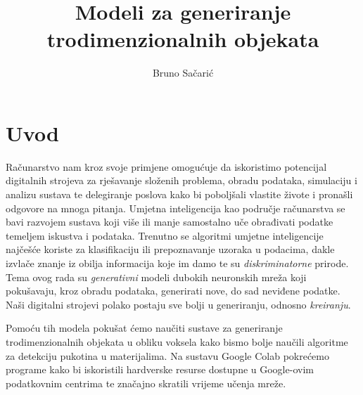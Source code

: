 \documentclass[times, utf8, diplomski]{fer}
\begin{document}

\title{Modeli za generiranje trodimenzionalnih objekata}

\author{Bruno Sačarić}

\maketitle

\izvornik


\tableofcontents

\chapter{Uvod}

Računarstvo nam kroz svoje primjene omogućuje da iskoristimo potencijal digitalnih strojeva za rješavanje složenih problema, obradu podataka, simulaciju i analizu sustava te delegiranje poslova kako bi poboljšali vlastite živote i pronašli odgovore na mnoga pitanja. Umjetna inteligencija kao područje računarstva se bavi razvojem sustava koji više ili manje samostalno uče obrađivati podatke temeljem iskustva i podataka. Trenutno se algoritmi umjetne inteligencije najčešće koriste za klasifikaciju ili prepoznavanje uzoraka u podacima, dakle izvlače znanje iz obilja informacija koje im damo te su \textit{diskriminatorne} prirode. Tema ovog rada su \textit{generativni} modeli dubokih neuronskih mreža koji pokušavaju, kroz obradu podataka, generirati nove, do sad neviđene podatke. Naši digitalni strojevi polako postaju sve bolji u generiranju, odnosno \textit{kreiranju}.

Pomoću tih modela pokušat ćemo naučiti sustave za generiranje trodimenzionalnih objekata u obliku voksela kako bismo bolje naučili algoritme za detekciju pukotina u materijalima. Na sustavu Google Colab pokrećemo programe kako bi iskoristili hardverske resurse dostupne u Google-ovim podatkovnim centrima te značajno skratili vrijeme učenja mreže.
\end{document}
